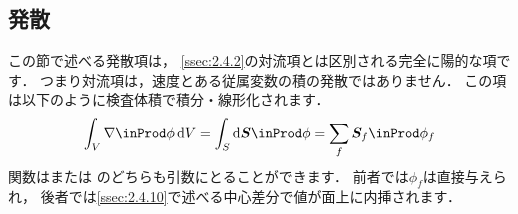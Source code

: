\subsection{発散}
\label{ssec:2.4.5}
この節で述べる発散項は，
\autoref{ssec:2.4.2}の対流項とは区別される完全に陽的な項です．
つまり対流項は，速度とある従属変数の積の発散ではありません．
この項は以下のように検査体積で積分・線形化されます．
\begin{align}
 \label{eq:2.24}
 \int_{V}\nabla \inProd \phi\,\mathrm{d}V
 = \int_{S}\mathrm{d}\bm{S} \inProd \phi
 = \sum_{f}\bm{S}_{f} \inProd \phi_{f}
\end{align}
関数はまたは
のどちらも引数にとることができます．
前者では$\phi_{f}$は直接与えられ，
後者では\autoref{ssec:2.4.10}で述べる中心差分で値が面上に内挿されます．


